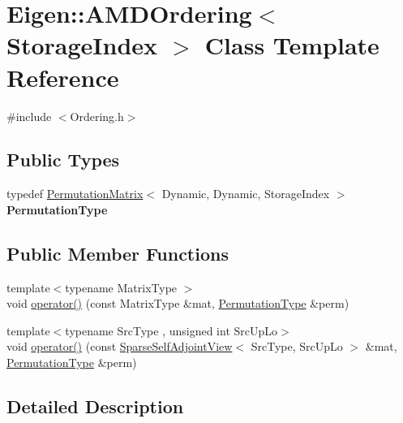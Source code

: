 \hypertarget{class_eigen_1_1_a_m_d_ordering}{}\section{Eigen\+::A\+M\+D\+Ordering$<$ Storage\+Index $>$ Class Template Reference}
\label{class_eigen_1_1_a_m_d_ordering}


{\ttfamily \#include $<$Ordering.\+h$>$}

\subsection*{Public Types}
\begin{DoxyCompactItemize}
\item 
\mbox{\label{class_eigen_1_1_a_m_d_ordering_ac28e5bdf8e7b08114bd76bc1fb95cc9a}} 
typedef \mbox{\hyperlink{class_eigen_1_1_permutation_matrix}{Permutation\+Matrix}}$<$ Dynamic, Dynamic, Storage\+Index $>$ {\bfseries Permutation\+Type}
\end{DoxyCompactItemize}
\subsection*{Public Member Functions}
\begin{DoxyCompactItemize}
\item 
{\footnotesize template$<$typename Matrix\+Type $>$ }\\void \mbox{\hyperlink{class_eigen_1_1_a_m_d_ordering_afce433557abcba9e49fa81581a58fa51}{operator()}} (const Matrix\+Type \&mat, \mbox{\hyperlink{class_eigen_1_1_permutation_matrix}{Permutation\+Type}} \&perm)
\item 
{\footnotesize template$<$typename Src\+Type , unsigned int Src\+Up\+Lo$>$ }\\void \mbox{\hyperlink{class_eigen_1_1_a_m_d_ordering_a7f3fd7224b084f0f5655c97ea8eb6466}{operator()}} (const \mbox{\hyperlink{class_eigen_1_1_sparse_self_adjoint_view}{Sparse\+Self\+Adjoint\+View}}$<$ Src\+Type, Src\+Up\+Lo $>$ \&mat, \mbox{\hyperlink{class_eigen_1_1_permutation_matrix}{Permutation\+Type}} \&perm)
\end{DoxyCompactItemize}


\subsection{Detailed Description}
